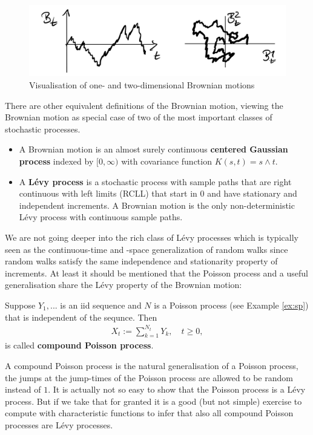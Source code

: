 \begin{figure}[h]
	\begin{center}
		\includegraphics[scale=0.08]{BB.jpeg}
		\caption*{Visualisation of one- and two-dimensional Brownian motions}
	\end{center}
\end{figure}	
There are other equivalent definitions of the Brownian motion, viewing the Brownian motion as special case of two of the most important classes of stochastic processes. 
\begin{itemize}
	\item A Brownian motion is an almost surely continuous \textbf{centered Gaussian process} indexed by $[0,\infty)$ with covariance function $K(s,t)=s\wedge t$. 
	\item A \textbf{L\'evy process} is a stochastic process with sample paths that are right continuous with left limits (RCLL) that start in $0$ and have stationary and independent increments. A Brownian motion is the only non-deterministic L\'evy process with continuous sample paths. 
\end{itemize}
We are not going deeper into the rich class of L\'evy processes which is typically seen as the continuous-time and -space generalization of random walks since random walks satisfy the same independence and stationarity property of increments. At least it should be mentioned that the Poisson process and a useful generalisation share the L\'evy property of the Brownian motion:
\begin{example}
	Suppose $Y_1,...$ is an iid sequence and $N$ is a Poisson process (see Example \ref{ex:sp}) that is independent of the sequnce. Then 
	\begin{align*}
			X_t:=\sum_{k=1}^{N_t}Y_k,\quad t\geq 0,
	\end{align*}
	is called \textbf{compound Poisson process}.
\end{example}
A compound Poisson process is the natural generalisation of a Poisson process, the jumps at the jump-times of the Poisson process are allowed to be random instead of $1$. It is actually not so easy to show that the Poisson process is a L\'evy process. But if we take that for granted it is a good (but not simple) exercise to compute with characteristic functions to infer that also all compound Poisson processes are L\'evy processes.
